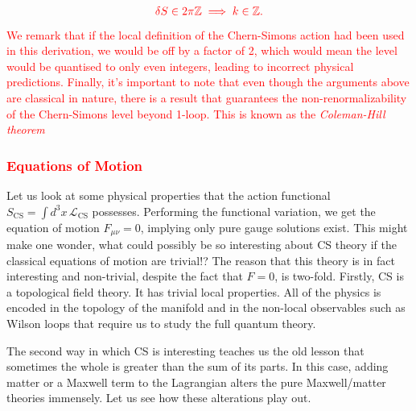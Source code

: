 \begin{align}
    \textcolor{red}{\delta S \in 2\pi \mathbb{Z} \implies k\in \mathbb{Z}.}
\end{align}
\textcolor{red}{We remark that if the local definition of the Chern-Simons action had been used in this derivation, we would be off by a factor of 2, which would mean the level would be quanti\textcolor{red}{s}ed to only even integers, leading to incorrect physical predictions. Finally, it's important to note that even though the arguments above are classical in nature, there is a result that guarantees the non-renormalizability of the Chern-Simons level beyond 1-loop. This is known as the \textit{Coleman-Hill theorem} \cite{Coleman:1985zi, Khare:1994yv}  }
 \textcolor{red}{\subsubsection*{Equations of Motion}}
    Let us look at some physical properties that the action functional $S_{\text{CS}} = \int d^3x \, \mathcal{L}_{\text{CS}}$ possesses. Performing the functional variation, we get the equation of motion $F_{\mu \nu}=0$, implying only pure gauge solutions exist. This might make one wonder, what could possibly be so interesting about CS theory if the classical equations of motion are trivial!?
    The reason that this theory is in fact interesting and non-trivial, despite the fact that $F=0$, is two-fold. Firstly, CS is a topological field theory. It has trivial local properties. All of the physics is encoded in the topology of the manifold and in the non-local observables such as Wilson loops that require us to study the full quantum theory.

    The second way in which CS is interesting teaches us the old lesson that sometimes the whole is greater than the sum of its parts. In this case, adding matter or a Maxwell term to the Lagrangian alters the pure Maxwell/matter theories immensely. Let us see how these alterations play out.

